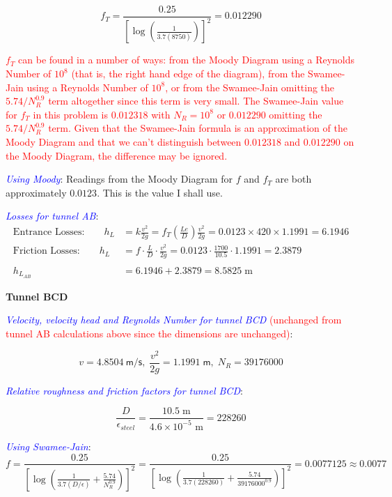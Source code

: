\documentclass[10pt,oneside]{amsart}
\begin{document}
\[
	f_T = \frac{0.25}{\left[\log\left(\frac{1}{3.7(8750)}\right)\right]^2} = 0.012290
\]

\textcolor{red}{$f_T$ can be found in a number of ways: from the Moody Diagram using a Reynolds Number of $10^8$ (that
	is, the right hand edge of the diagram), from the Swamee-Jain using a Reynolds Number of $10^8$, or from the
	Swamee-Jain omitting the $5.74/N_R^{0.9}$ term altogether since this term is very small. The Swamee-Jain value for $f_T$ in this problem is $0.012318$ with $N_R=10^8$
	or $0.012290$ omitting the $5.74/N_R^{0.9}$ term. Given that the Swamee-Jain formula is an approximation of the Moody
	Diagram and that we can't distinguish between $0.012318$ and $0.012290$ on the Moody Diagram, the difference may be
ignored.}

\textcolor{blue}{\em Using Moody}:
Readings from the Moody Diagram for $f$ and $f_T$ are both approximately $0.0123$. This is the
value I shall use.

\textcolor{blue}{\em Losses for tunnel AB}:
\begin{align*}
	\text{Entrance Losses:}\qquad h_{L} & = k\frac{v^2}{2g} =                        
	f_T\left(\frac{Le}{D}\right)\frac{v^2}{2g}=0.0123\times 420\times 1.1991 = 6.1946\\
	\text{Friction Losses:}\qquad h_{L} & =  f\cdot\frac{L}{D} \cdot\frac{v^2}{2g} = 
	0.0123\cdot\frac{1700}{10.5}\cdot1.1991 = 2.3879\\\\
	h_{L_{AB}}                          & = 6.1946+2.3879 = 8.5825\;\text{m}         
\end{align*}

\textbf{Tunnel BCD}

\textcolor{blue}{\em Velocity, velocity head and Reynolds Number for tunnel BCD } \textcolor{red}{ (unchanged from
tunnel AB calculations above since the dimensions are unchanged)}:

\[
	v = 4.8504\mathsf{\ m/s},\;\frac{v^2}{2g} = 1.1991\mathsf{\; m},\; N_R = 39176000
\]

\textcolor{blue}{\em Relative roughness and friction factors for tunnel BCD}:

\[
	\frac{D}{\epsilon_{steel}} = \frac{10.5\;\text{m}}{4.6\times10^{-5}\text{ m}} = 228260
\]

\textcolor{blue}{\em Using Swamee-Jain}:
\[
	f = \frac{0.25}{\left[\log\left(\frac{1}{3.7(D/\epsilon)}+\frac{5.74}{N_R^{0.9}}\right)\right]^2} =
	\frac{0.25}{\left[\log\left(\frac{1}{3.7(228260)}+\frac{5.74}{39176000^{0.9}}\right)\right]^2}=0.0077125\approx 0.0077
\]
\end{document}

